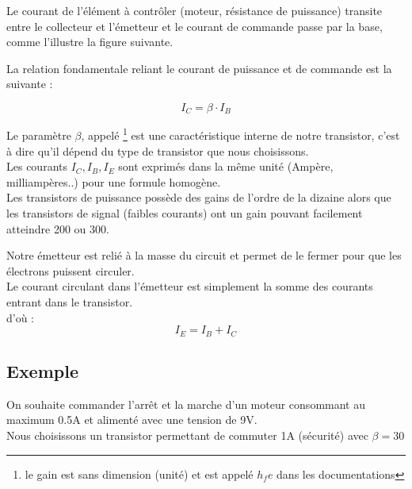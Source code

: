 Le courant de l'élément à contrôler (moteur, résistance de puissance) transite entre le collecteur et l'émetteur et le courant de commande passe par la base, comme l'illustre la figure suivante.\\


La relation fondamentale reliant le courant de puissance et de commande est la suivante : 

$$ \boxed{ I_{C} = \beta \cdot I_{B} }$$

Le paramètre $\beta$, appelé \footnote{le gain est sans dimension (unité) et est appelé $ h_fe$ dans les documentations} est une caractéristique interne de notre transistor, c'est à dire qu'il dépend du type de transistor que nous choisissons.\\
Les courants $I_{C}, I_{B},I_{E}$ sont exprimés dans la même unité (Ampère, milliampères..) pour une formule homogène.\\

Les transistors de puissance possède des gains de l'ordre de la dizaine alors que les transistors de signal (faibles courants) ont un gain pouvant facilement atteindre 200 ou 300.



\begin{reponse}
  
  Notre émetteur est relié à la masse du circuit et permet de le fermer pour que les électrons puissent circuler.\\

  Le courant circulant dans l'émetteur est simplement la somme des courants entrant dans le transistor. \\
  d'où : $$ \boxed{ I_{E} = I_{B} + I_{C} }$$

  \end{reponse}



\subsection{Exemple}

On souhaite commander l'arrêt et la marche d'un moteur consommant au maximum 0.5A et alimenté avec une tension de 9V. \\
Nous choisissons un transistor permettant de commuter 1A (sécurité) avec $\beta=30$ \\

